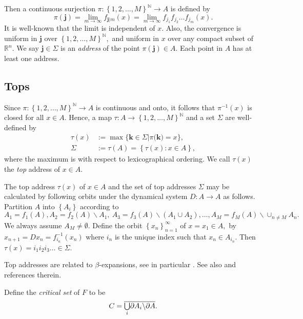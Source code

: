 \documentclass{amsproc}%
\theoremstyle{plain}
\theoremstyle{definition}
\numberwithin{equation}{section}
\begin{document}
Then a continuous surjection $\pi:\left\{  1,2,\dots,M\right\}  ^{\mathbb{N}%
}\rightarrow A$ is defined by%
\[
\pi(\mathbf{j})=\lim_{m\rightarrow\infty}f_{\mathbf{j}|m}(x)=\lim
_{m\rightarrow\infty}f_{j_{1}}f_{j_{2}}\dots f_{j_{m}}(x).
\]
It is well-known \cite{hutchinson} that the limit is independent of $x$. Also,
the convergence is uniform in $\mathbf{j}$ over $\left\{  1,2,\dots,M\right\}
^{\mathbb{N}},$ and uniform in $x$ over any compact subset of $\mathbb{R}^{n}%
$. We say $\mathbf{j}\in\Sigma$ is an \textit{address} of the point
$\pi(\mathbf{j})\in A$. Each point in $A$ has at least one address.

\subsection{\label{tops section}Tops}

Since $\pi:\left\{  1,2,\dots,M\right\}  ^{\mathbb{N}}\rightarrow A$ is
continuous and onto, it follows that $\pi^{-1}(x)$ is closed for all $x\in A.$
Hence, a map $\tau:A\rightarrow\left\{  1,2,\dots,M\right\}  ^{\mathbb{N}}$
and a set $\Sigma$ are well-defined by
\begin{align*}
\tau(x)  &  :=\max\{\mathbf{k\in}\Sigma|\pi(\mathbf{k)=}x\},\\
\Sigma &  :=\tau(A)=\left\{  \tau(x):x\in A\right\}  ,
\end{align*}
where the maximum is with respect to lexicographical ordering. We call
$\tau(x)$ the \textit{top }address\textit{ }of $x\in A$.

The top address $\tau(x)$ of $x\in A$ and the set of top addresses $\Sigma$
may be calculated by following orbits under the dynamical system\textit{
}$D:A\rightarrow A$ as follows. Partition $A$ into $\left\{  A_{i}\right\}  $
according to
\[
A_{1}=f_{1}(A),A_{2}=f_{2}(A)\backslash A_{1},\ A_{3}=f_{3}(A)\backslash
(A_{1}\cup A_{2}),\dots,A_{M}=f_{M}(A)\backslash\cup_{n\neq M}A_{n}.
\]
We always assume $A_{M}\neq\emptyset.$ Define the orbit $\left\{
x_{n}\right\}  _{n=1}^{\infty}$ of $x=x_{1}\in A,$ by $x_{n+1}=Dx_{n}%
=f_{i_{n}}^{-1}(x_{n})$ where $i_{n}$ is the unique index such that $x_{n}\in
A_{i_{n}}$. Then $\tau(x)=i_{1}i_{2}i_{3}\dots\in\Sigma$.

Top addresses are related to $\beta$-expansions, see in particular
\cite{thurston}. See also \cite{akiyama} and references therein.

Define the \textit{critical set }of $F$ to be
\[
C=\overline{%
{\textstyle\bigcup\limits_{i}}
\partial A_{i}\backslash\partial A}.
\]
\end{document}
